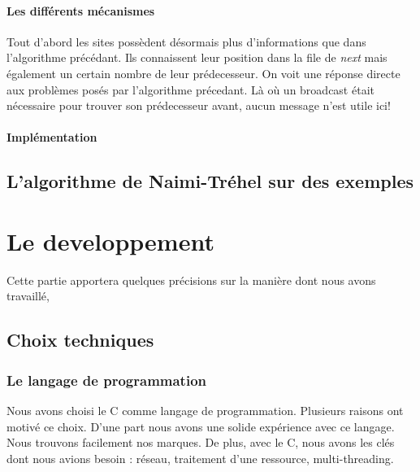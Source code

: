 \documentclass[a4paper,12pt]{article}
\newcommand{\nt}{Naimi-Tréhel }
\begin{document}
\paragraph{Les différents mécanismes}
Tout d'abord les sites possèdent désormais plus d'informations que dans l'algorithme précédant. Ils connaissent leur position dans la file de \textit{next} mais également un certain nombre de leur prédecesseur. On voit une réponse directe aux problèmes posés par l'algorithme précedant. Là où un broadcast était nécessaire pour trouver son prédecesseur avant, aucun message n'est utile ici! 

\paragraph{Implémentation}


\subsection{L'algorithme de \nt sur des exemples}


\section{Le developpement}

Cette partie apportera quelques précisions sur la manière dont nous avons travaillé, 

\subsection{Choix techniques}
\subsubsection{Le langage de programmation}
Nous avons choisi le C comme langage de programmation. Plusieurs raisons ont motivé ce choix. 
D'une part nous avons une solide expérience avec ce langage. Nous trouvons facilement nos marques.
De plus, avec le C, nous avons les clés dont nous avions besoin : réseau, traitement d'une ressource, multi-threading.
\end{document}
